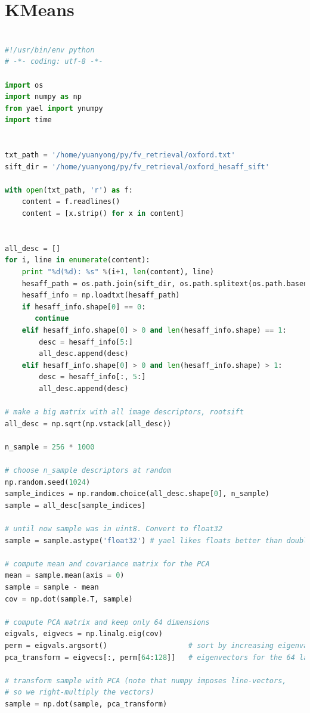 \documentclass[color=cyan,mathpazo,titlestyle=hang]{elegantbook}
\begin{document}
\section{KMeans}

\begin{lstlisting}[language=python]

#!/usr/bin/env python
# -*- coding: utf-8 -*-

import os
import numpy as np
from yael import ynumpy
import time


txt_path = '/home/yuanyong/py/fv_retrieval/oxford.txt'
sift_dir = '/home/yuanyong/py/fv_retrieval/oxford_hesaff_sift'

with open(txt_path, 'r') as f:
    content = f.readlines()
    content = [x.strip() for x in content]


all_desc = []
for i, line in enumerate(content):
    print "%d(%d): %s" %(i+1, len(content), line)
    hesaff_path = os.path.join(sift_dir, os.path.splitext(os.path.basename(line))[0] + '.hesaff.sift')
    hesaff_info = np.loadtxt(hesaff_path)
    if hesaff_info.shape[0] == 0:
       continue
    elif hesaff_info.shape[0] > 0 and len(hesaff_info.shape) == 1:
        desc = hesaff_info[5:]
        all_desc.append(desc)
    elif hesaff_info.shape[0] > 0 and len(hesaff_info.shape) > 1:
        desc = hesaff_info[:, 5:]
        all_desc.append(desc)

# make a big matrix with all image descriptors, rootsift
all_desc = np.sqrt(np.vstack(all_desc))

n_sample = 256 * 1000

# choose n_sample descriptors at random
np.random.seed(1024)
sample_indices = np.random.choice(all_desc.shape[0], n_sample)
sample = all_desc[sample_indices]

# until now sample was in uint8. Convert to float32
sample = sample.astype('float32') # yael likes floats better than doubles

# compute mean and covariance matrix for the PCA
mean = sample.mean(axis = 0)
sample = sample - mean
cov = np.dot(sample.T, sample)

# compute PCA matrix and keep only 64 dimensions
eigvals, eigvecs = np.linalg.eig(cov)
perm = eigvals.argsort()                   # sort by increasing eigenvalue
pca_transform = eigvecs[:, perm[64:128]]   # eigenvectors for the 64 last eigenvalues

# transform sample with PCA (note that numpy imposes line-vectors,
# so we right-multiply the vectors)
sample = np.dot(sample, pca_transform)


\end{lstlisting}
\end{document}
